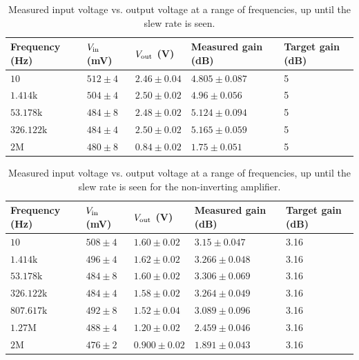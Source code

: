 \documentclass[11pt]{article}
\begin{document}
\begin{table}[H]
	\centering
	\begin{tabular}{|l|l|l|l|l|}
	\hline
	Frequency (Hz)    & $V_{\rm in}$ (mV) & $V_{\rm out}$ (V) & Measured gain (dB) & Target gain (dB) \\
	\hline
	$10$              & $512 \pm 4$      & $2.46 \pm 0.04$   & $4.805 \pm 0.087$  & 5                \\
	$1.414\text{k}$   & $504 \pm 4$      & $2.50 \pm 0.02$   & $4.96 \pm 0.056$   & 5                \\
	$53.178\text{k}$  & $484 \pm 8$      & $2.48 \pm 0.02$   & $5.124 \pm 0.094$  & 5                \\
	$326.122\text{k}$ & $484 \pm 4$      & $2.50 \pm 0.02$   & $5.165 \pm 0.059$  & 5                \\
	$2\text{M}$       & $480 \pm 8$      & $0.84 \pm 0.02$   & $1.75 \pm 0.051$   & 5                \\
	\hline
	\end{tabular}
	\caption{Measured input voltage vs. output voltage at a range of
	frequencies, up until the slew rate is seen.}
\end{table}

\begin{table}[H]
	\centering
	\begin{tabular}{|l|l|l|l|l|}
	\hline
	Frequency (Hz)    & $V_{\rm in}$ (mV) & $V_{\rm out}$ (V) & Measured gain (dB) & Target gain (dB) \\
	\hline
	$10$              & $508 \pm 4$      & $1.60 \pm 0.02$   & $3.15 \pm 0.047$   & 3.16             \\
	$1.414\text{k}$   & $496 \pm 4$      & $1.62 \pm 0.02$   & $3.266 \pm 0.048$  & 3.16             \\
	$53.178\text{k}$  & $484 \pm 8$      & $1.60 \pm 0.02$   & $3.306 \pm 0.069$  & 3.16             \\
	$326.122\text{k}$ & $484 \pm 4$      & $1.58 \pm 0.02$   & $3.264 \pm 0.049$  & 3.16             \\
	$807.617\text{k}$ & $492 \pm 8$      & $1.52 \pm 0.04$   & $3.089 \pm 0.096$  & 3.16             \\
	$1.27\text{M}$    & $488 \pm 4$      & $1.20 \pm 0.02$   & $2.459 \pm 0.046$  & 3.16             \\
	$2\text{M}$       & $476 \pm 2$      & $0.900 \pm 0.02$  & $1.891 \pm 0.043$  & 3.16             \\
	\hline
	\end{tabular}
	\caption{Measured input voltage vs. output voltage at a range of
	frequencies, up until the slew rate is seen for the non-inverting
	amplifier.}
\end{table}
\end{document}
